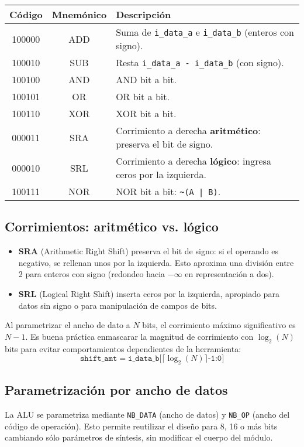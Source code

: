 \begin{center}
\begin{tabular}{|c|c|l|}
\hline
\textbf{Código} & \textbf{Mnemónico} & \textbf{Descripción} \\
\hline
100000 & ADD & Suma de \texttt{i\_data\_a} e \texttt{i\_data\_b} (enteros con signo). \\
100010 & SUB & Resta \texttt{i\_data\_a - i\_data\_b} (con signo). \\
100100 & AND & AND bit a bit. \\
100101 & OR  & OR bit a bit. \\
100110 & XOR & XOR bit a bit. \\
000011 & SRA & Corrimiento a derecha \textbf{aritmético}: preserva el bit de signo. \\
000010 & SRL & Corrimiento a derecha \textbf{lógico}: ingresa ceros por la izquierda. \\
100111 & NOR & NOR bit a bit: \texttt{\textasciitilde (A | B)}. \\
\hline
\end{tabular}
\end{center}

\subsection{Corrimientos: aritmético vs. lógico}
\begin{itemize}
    \item \textbf{SRA} (Arithmetic Right Shift) preserva el bit de signo: si el operando es negativo, se rellenan unos por la izquierda. Esto aproxima una división entre 2 para enteros con signo (redondeo hacia $-\infty$ en representación a dos).
    \item \textbf{SRL} (Logical Right Shift) inserta ceros por la izquierda, apropiado para datos sin signo o para manipulación de campos de bits.
\end{itemize}
Al parametrizar el ancho de dato a $N$ bits, el corrimiento máximo significativo es $N-1$. Es buena práctica enmascarar la magnitud de corrimiento con $\log_2(N)$ bits para evitar comportamientos dependientes de la herramienta:
\[
\texttt{shift\_amt} = \texttt{i\_data\_b[} \lceil\log_2(N)\rceil \texttt{-1:0]}
\]

\subsection{Parametrización por ancho de datos}
La ALU se parametriza mediante \texttt{NB\_DATA} (ancho de datos) y \texttt{NB\_OP} (ancho del código de operación). Esto permite reutilizar el diseño para 8, 16 o más bits cambiando sólo parámetros de síntesis, sin modificar el cuerpo del módulo.

